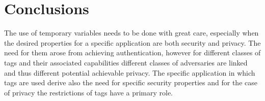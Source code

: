 \chapter*{Conclusions} 

The use of temporary variables needs to be done with great care, especially when the desired 
properties for a specific application are both security and privacy. The need for them arose
from achieving authentication, however for different classes of tags and their associated capabilities
different classes of adversaries are linked and thus different potential achievable privacy.
The specific application in which tags are used derive also the need for specific security properties
and for the case of privacy the restrictions of tags have a primary role.